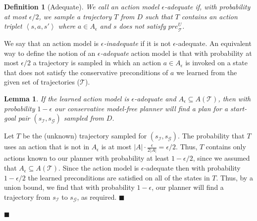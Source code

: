 \documentclass{article}
\newtheorem{definition}{Definition}
\newtheorem{lemma}{Lemma}
\newenvironment{proof}{\noindent{\bf Proof:~~}}{\qed}
\newcommand{\tuple}[1]{\ensuremath{\left \langle #1 \right \rangle }}
\newcommand{\qed}{\hfill\ensuremath{\blacksquare}}
\newcommand{\pre}{\textit{pre}}
\begin{document}
\begin{proof}
		
		\begin{definition}[Adequate]
			We call an action model {\em $\epsilon$-adequate} if, with probability at most $\epsilon/2$, we sample a trajectory $T$ from $D$ such that $T$ contains an action triplet $\tuple{s,a,s'}$  where $a\in A_\epsilon$ and $s$ does not satisfy $\pre_\mathcal{T}^U$. 
			\label{def:adequate}
		\end{definition}
		We say that an action model is {\em $\epsilon$-inadequate} if it is not $\epsilon$-adequate. 
		An equivalent way to define the notion of an {\em $\epsilon$-adequate} action model is
		that with probability at most $\epsilon/2$ 
		a trajectory is sampled in which an action $a\in A_\epsilon$ is invoked on a state that 
		does not satisfy the conservative preconditions of $a$ we learned from the given set of trajectories ($\mathcal{T}$).  
		
		
		\begin{lemma}
			If the learned action model is $\epsilon$-adequate and $A_\epsilon\subseteq A(\mathcal{T})$, 
			then with probability $1-\epsilon$ our conservative model-free planner will find a plan for a start-goal pair $(s_\mathcal{I},s_\mathcal{G})$ sampled from $D$.
			\label{lem:plan-existance}
		\end{lemma}
		\begin{proof}
			Let $T$ be the (unknown) trajectory sampled for $(s_\mathcal{I},s_\mathcal{G})$. 
			The probability that $T$ uses an action that is not in 
			$A_\epsilon$ is at most $|A|\cdot\frac{\epsilon}{2|A|}=\epsilon/2$. 
			Thus, $T$ contains only actions known to our planner with probability at least $1-\epsilon/2$, since we assumed that $A_\epsilon\subseteq A(\mathcal{T})$. 
			Since the action model is $\epsilon$-adequate then with probability $1-\epsilon/2$ the learned preconditions are satisfied on all of the states in $T$. Thus, by a union bound, we find that with probability $1-\epsilon$, our planner will find a trajectory from $s_\mathcal{I}$ to $s_\mathcal{G}$, as required. 
		\end{proof}
		

\end{proof}
\end{document}
